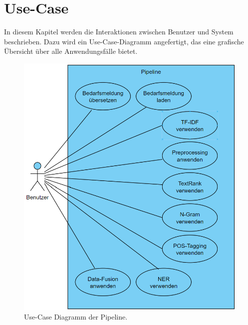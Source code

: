 \section{Use-Case}
\label{sec:usecase}
In diesem Kapitel werden die Interaktionen zwischen Benutzer und System beschrieben. Dazu wird ein Use-Case-Diagramm angefertigt, das eine grafische Übersicht über alle Anwendungsfälle bietet.
\begin{figure}[H]
	\centering  
	\includegraphics[width=\linewidth]{Abbildungen/use-case.png}
	\caption{Use-Case Diagramm der Pipeline.}
	\label{fig:usecasediagrammwirklich}
\end{figure}\mbox{} \\
